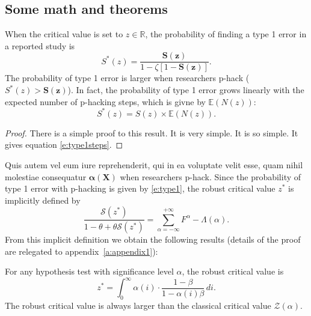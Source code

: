 \documentclass[letterpaper,12pt,leqno]{article}
\begin{document}
\subsection{Some math and theorems} 

\begin{proposition}\label{p:type1}  When the critical value is set to $z \in \mathbb{R}$, the probability of finding a type 1 error in a reported study is
\begin{equation}
S^*(z) = \frac{\bm{S(z)}}{ 1 -\zeta [1- \bm{S(z)}]}.
\label{e:type1}\end{equation}
The probability of type 1 error is larger when researchers p-hack ($S^*(z) > \bm{S(z)}$). In fact, the probability of type 1 error grows linearly with the expected number of p-hacking steps, which is givne by $\mathbb{E}(N(z))$:
\begin{equation}
S^*(z) = S(z) \times \mathbb{E}(N(z)).
\label{e:type1steps}\end{equation}
\end{proposition}

\begin{proof} There is a simple proof to this result. It is very simple. It is so simple. It gives equation \eqref{e:type1steps}.\end{proof} 

 Quis autem vel eum iure reprehenderit, qui in ea voluptate velit esse, quam nihil molestiae consequatur $\bm{\alpha(X)}$ when researchers p-hack. Since the probability of type 1 error with p-hacking is given by \eqref{e:type1}, the robust critical value $z^*$ is implicitly defined by
\begin{equation*}
\frac{\mathcal{S}(z^*)}{1 -\theta + \theta \mathcal{S}(z^*)} = \sum_{\alpha=-\infty}^{+\infty}F^{\alpha} - \Lambda(\alpha).
\end{equation*}
From this implicit definition we obtain the following results (details of the proof are relegated to appendix~\ref{a:appendix1}):

\begin{lemma}\label{p:cv} For any hypothesis test with significance level $\alpha$, the robust critical value is
\begin{equation}
z^* = \int_{0}^{\infty} \alpha(i) \cdot \frac{1-\beta}{1-\alpha(i)\beta}\,di.
\label{e:cv}\end{equation}
The robust critical value is always larger than the classical critical value $\mathcal{Z}(\alpha)$. \end{lemma}
\end{document}
